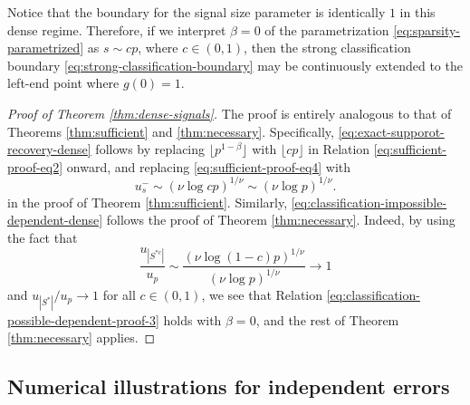 \begin{remark}
Notice that the boundary for the signal size parameter is identically $1$ in this dense regime.
Therefore, if we interpret $\beta = 0$ of the parametrization \eqref{eq:sparsity-parametrized} as $s\sim cp$, where $c\in(0,1)$, then the strong classification boundary \eqref{eq:strong-classification-boundary} may be continuously extended to the left-end point where $g(0)=1$.
\end{remark}

\begin{proof}[Proof of Theorem \ref{thm:dense-signals}]
The proof is entirely analogous to that of Theorems \ref{thm:sufficient} and \ref{thm:necessary}.
Specifically, \eqref{eq:exact-supporot-recovery-dense} follows by replacing $\lfloor p^{1-\beta} \rfloor$ with $\lfloor cp \rfloor$ in Relation \eqref{eq:sufficient-proof-eq2} onward, and replacing \eqref{eq:sufficient-proof-eq4} with
$$
u_s^- \sim (\nu\log{cp})^{1/\nu} \sim (\nu\log{p})^{1/\nu}.
$$
in the proof of Theorem \ref{thm:sufficient}.
Similarly, \eqref{eq:classification-impossible-dependent-dense} follows the proof of Theorem \ref{thm:necessary}. 
Indeed, by using the fact that
$$
\frac{u_{|S^{*c}|}}{u_p} \sim \frac{(\nu\log{(1-c)p})^{1/\nu}}{(\nu\log{p})^{1/\nu}} \to 1
$$
and ${u_{|S^*|}}/{u_p}\to 1$ for all $c\in(0,1)$, we see that Relation \eqref{eq:classification-possible-dependent-proof-3} holds with $\beta=0$, and the rest of Theorem \ref{thm:necessary} applies.
\end{proof}


\subsection{Numerical illustrations for independent errors}
\label{suppsec:numerical}

